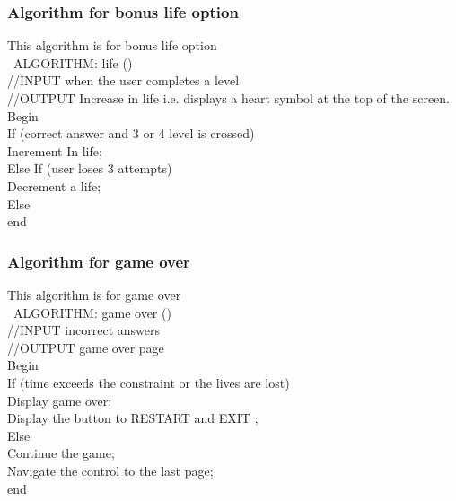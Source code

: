 \subsubsection{Algorithm for bonus life option}
 \hspace{1cm}This algorithm is for bonus life option\\ 
\rmfamily\ ALGORITHM: life ()\\
//INPUT when the user completes a level\\
//OUTPUT Increase in life i.e.  displays a heart symbol at the top of the screen.\\
Begin\\
If (correct answer and 3 or 4 level is crossed)\\
Increment In life;\\
Else If (user loses 3 attempts)\\
Decrement a life;\\
Else \\
end
\rmfamily

\subsubsection{Algorithm for  game over}
\hspace{1cm}This algorithm is for game over\\
\rmfamily\ ALGORITHM: game over ()\\
//INPUT incorrect answers\\
//OUTPUT game over page\\
Begin\\
If (time exceeds the constraint or the lives are lost)\\
Display game over;\\
Display the button to RESTART and EXIT ;\\
Else\\
Continue the game;\\
Navigate the control to the last page;\\
end
\rmfamily
